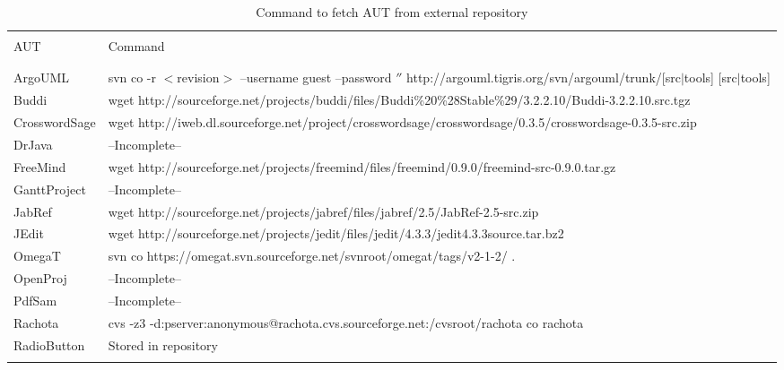 %
%
\begin{table*}[tbp]
   \centering
   \scriptsize{
   \begin{tabular}{ll}
      \hline
      & \\
      AUT           & Command \\
      & \\
      \hline
      & \\
      ArgoUML       & svn co -r $<$revision$>$ --username guest --password $''$ http://argouml.tigris.org/svn/argouml/trunk/[src$|$tools] [src$|$tools] \\
      Buddi         & wget http://sourceforge.net/projects/buddi/files/Buddi\%20\%28Stable\%29/3.2.2.10/Buddi-3.2.2.10.src.tgz \\
      CrosswordSage & wget http://iweb.dl.sourceforge.net/project/crosswordsage/crosswordsage/0.3.5/crosswordsage-0.3.5-src.zip \\
      DrJava        & --Incomplete-- \\
      FreeMind      & wget http://sourceforge.net/projects/freemind/files/freemind/0.9.0/freemind-src-0.9.0.tar.gz \\
      GanttProject  & --Incomplete-- \\
      JabRef        & wget http://sourceforge.net/projects/jabref/files/jabref/2.5/JabRef-2.5-src.zip \\
      JEdit         & wget http://sourceforge.net/projects/jedit/files/jedit/4.3.3/jedit4.3.3source.tar.bz2 \\
      OmegaT        & svn co https://omegat.svn.sourceforge.net/svnroot/omegat/tags/v2-1-2/ . \\
      OpenProj      & --Incomplete-- \\
      PdfSam        & --Incomplete-- \\
      Rachota       & cvs -z3 -d:pserver:anonymous@rachota.cvs.sourceforge.net:/cvsroot/rachota co  rachota \\
      RadioButton   & Stored in \mddozen{} repository \\
      &  \\
   \end{tabular}
   }
   \caption{Command to fetch AUT from external repository}
   \label{table:autcheckout}
\end{table*}
